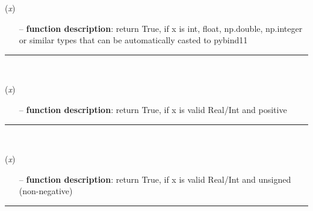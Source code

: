 \begin{itemize}[leftmargin=1.4cm]
\begin{flushleft}
\label{sec:advancedUtilities:IsValidRealInt}
({\it x})
\end{flushleft}
\setlength{\itemindent}{0.7cm}
\begin{itemize}[leftmargin=0.7cm]
\item[--]
{\bf function description}: return True, if x is int, float, np.double, np.integer or similar types that can be automatically casted to pybind11
\vspace{12pt}\end{itemize}
%
\noindent\rule{8cm}{0.75pt}\vspace{1pt} \\ 
\begin{flushleft}
\label{sec:advancedUtilities:IsValidPRealInt}
({\it x})
\end{flushleft}
\setlength{\itemindent}{0.7cm}
\begin{itemize}[leftmargin=0.7cm]
\item[--]
{\bf function description}: return True, if x is valid Real/Int and positive
\vspace{12pt}\end{itemize}
%
\noindent\rule{8cm}{0.75pt}\vspace{1pt} \\ 
\begin{flushleft}
\label{sec:advancedUtilities:IsValidURealInt}
({\it x})
\end{flushleft}
\setlength{\itemindent}{0.7cm}
\begin{itemize}[leftmargin=0.7cm]
\item[--]
{\bf function description}: return True, if x is valid Real/Int and unsigned (non-negative)
\vspace{12pt}\end{itemize}
%
\noindent\rule{8cm}{0.75pt}\vspace{1pt} \\ 
\begin{flushleft}
\label{sec:advancedUtilities:IsReal}

\end{flushleft}
\end{itemize}
